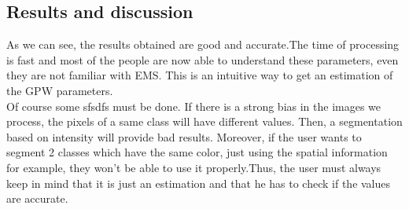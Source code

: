 \subsection{Results and discussion}
As we can see, the results obtained are good and accurate.The time of processing is fast and most of the people are now able to understand these parameters, even they are not familiar with EMS. This is an intuitive way to get an estimation of the GPW parameters.\\
Of course some sfsdfs must be done.
If there is a strong bias in the images we process, the pixels of a same class will have different values. Then, a segmentation based on intensity will provide bad results. Moreover, if the user wants to segment 2 classes which have the same color, just using the spatial information for example, they won't be able to use it properly.Thus, the user must always keep in mind that it is just an estimation and that he has to check if the values are accurate.


